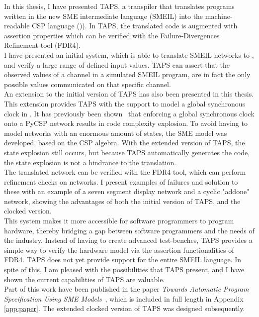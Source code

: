 In this thesis, I have presented TAPS, a transpiler that translates programs written in the
new SME intermediate language (SMEIL) into the machine-readable CSP language ()\cspm{}). In TAPS, the translated \cspm{} code is augmented with assertion
properties which can be verified with the Failure-Divergences Refinement tool
(FDR4).\\
I have presented an initial system, which is able to translate SMEIL networks to
\cspm{}, and verify a large range of defined input values. TAPS can assert that
the observed values of a channel in a simulated SMEIL program, are in fact the
only possible values communicated on that specific channel. \\

An extension to the initial version of TAPS has also been presented in this
thesis. This extension provides TAPS with the support to model a global
synchronous clock in \cspm{}. It has previously been shown~\cite{Skaarup14}
that enforcing a global synchronous clock onto a PyCSP network results in code complexity explosion. To avoid having to model networks with an enormous amount of
states, the SME model was developed, based on the CSP algebra. With the
extended version of TAPS, the state explosion still occurs, but because TAPS automatically generates the \cspm{} code, the state explosion is not a hindrance to the
translation.\\

The translated \cspm{} network can be verified with the FDR4 tool, which can
perform refinement checks on \cspm{} networks. I present examples of failures
and solution to these with an example of a seven segment display network and a
cyclic "addone" network, showing the advantages of both the initial version of TAPS, and the clocked version.\\

This system makes it more accessible for software programmers to program
hardware, thereby bridging a gap between software programmers and the needs
of the industry.
Instead of having to create advanced test-benches, TAPS provides a simple
way to verify the hardware model via the assertion functionalities of FDR4.
TAPS does not yet provide support for the entire SMEIL language. In spite of this,
I am pleased with the possibilities that TAPS present, and I have shown the current capabilities of TAPS are valuable.\\

Part of this work have been published in the paper \textit{Towards Automatic Program Specification Using SME Models}~\cite{TheglerEtAl2018}, which is included in full length in Appendix \ref{app:paper}. The extended clocked version of TAPS was designed subsequently.
